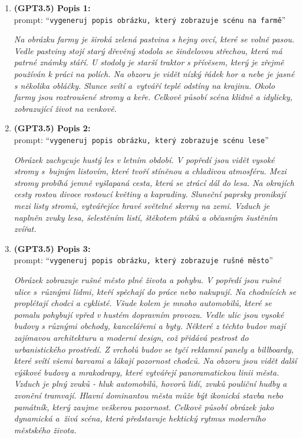 \begin{enumerate}
	\item \textbf{(GPT3.5) Popis 1:} \\
	      prompt: \enquote{\texttt{vygeneruj popis obrázku, který zobrazuje scénu na farmě}}

	      \emph{Na obrázku farmy je široká zelená pastvina s hejny ovcí, které se volně pasou. Vedle pastviny stojí starý dřevěný stodola se šindelovou střechou, která má patrné známky stáří. U stodoly je starší traktor s přívěsem, který je zřejmě používán k práci na polích. Na obzoru je vidět nízký řádek hor a nebe je jasné s několika obláčky. Slunce svítí a~vytváří teplé odstíny na krajinu. Okolo farmy jsou roztroušené stromy a keře. Celkově působí scéna klidně a idylicky, zobrazující život na venkově.}

	\item \textbf{(GPT3.5) Popis 2:} \\
	      prompt: \enquote{\texttt{vygeneruj popis obrázku, který zobrazuje scénu lese}}

	      \emph{Obrázek zachycuje hustý les v letním období. V popředí jsou vidět vysoké stromy s~bujným listovím, které tvoří stíněnou a chladivou atmosféru. Mezi stromy probíhá jemně vyšlapaná cesta, která se ztrácí dál do lesa. Na okrajích cesty rostou divoce rostoucí květiny a kapradiny. Sluneční paprsky pronikají mezi listy stromů, vytvářejíce hravé světelné skvrny na zemi. Vzduch je naplněn zvuky lesa, šelestěním listí, štěkotem ptáků a občasným šustěním zvířat.}
	\item \textbf{(GPT3.5) Popis 3:} \\
	      prompt: \enquote{\texttt{vygeneruj popis obrázku, který zobrazuje rušné město}}

	      \emph{Obrázek zobrazuje rušné město plné života a pohybu. V popředí jsou rušné ulice s~různými lidmi, kteří spěchají do práce nebo nakupují. Na chodnících se proplétají chodci a cyklisté. Všude kolem je mnoho automobilů, které se pomalu pohybují vpřed v hustém dopravním provozu.
		      Vedle ulic jsou vysoké budovy s různými obchody, kancelářemi a byty. Některé z těchto budov mají zajímavou architekturu a moderní design, což přidává pestrost do urbanistického prostředí. Z vrcholů budov se tyčí reklamní panely a billboardy, které svítí všemi barvami a lákají pozornost chodců.
		      Na obzoru jsou vidět další výškové budovy a mrakodrapy, které vytvářejí panoramatickou linii města. Vzduch je plný zvuků - hluk automobilů, hovorů lidí, zvuků pouliční hudby a zvonění tramvají.
		      Hlavní dominantou města může být ikonická stavba nebo památník, který zaujme veškerou pozornost. Celkově působí obrázek jako dynamická a~živá scéna, která představuje hektický rytmus moderního městského života.}
\end{enumerate}
